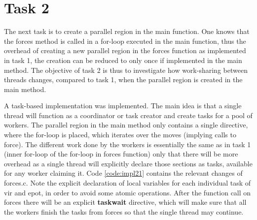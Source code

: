 \documentclass[journal]{IEEEtran}
\begin{document}
\section{Task 2}
The next task is to create a parallel region in the main function. One knows that the forces method is called in a for-loop executed in the main function, thus the overhead of creating a new parallel region in the forces function as implemented in task 1, the creation can be reduced to only once if implemented in the main method. The objective of task 2 is thus to investigate how work-sharing between threads changes, compared to task 1, when the parallel region is created in the main method.

A task-based implementation was implemented. The main idea is that a single thread will function as a coordinator or task creator and create tasks for a pool of workers. The parallel region in the main method only contains a single directive, where the for-loop is placed, which iterates over the moves (implying calls to force). The different work done by the workers is essentially the same as in task 1 (inner for-loop of the for-loop in forces function) only that there will be more overhead as a single thread will explicitly declare those sections as tasks, available for any worker claiming it. Code \ref{code:impl21} contains the relevant changes of forces.c. Note the explicit declaration of local variables for each individual task of vir and epot, in order to avoid some atomic operations. After the function call on forces there will be an explicit \textbf{taskwait} directive, which will make sure that all the workers finish the tasks from forces so that the single thread may continue.
\end{document}
